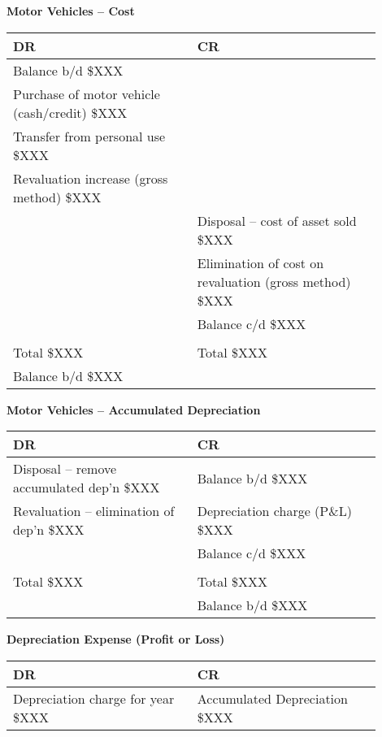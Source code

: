 
\textbf{Motor Vehicles – Cost}\\[3pt]
\begin{tabular}{@{}p{0.45\linewidth} p{0.45\linewidth}@{}}
\textbf{DR} & \textbf{CR} \\ \midrule
Balance b/d \hfill \$XXX & \\
Purchase of motor vehicle (cash/credit) \hfill \$XXX & \\
Transfer from personal use \hfill \$XXX & \\
Revaluation increase (gross method) \hfill \$XXX & \\
& Disposal – cost of asset sold \hfill \$XXX \\
& Elimination of cost on revaluation (gross method) \hfill \$XXX \\
& Balance c/d \hfill \$XXX \\[3pt]
\multicolumn{2}{c}{\hrulefill} \\
Total \hfill \$XXX & Total \hfill \$XXX \\[6pt]
Balance b/d \hfill \$XXX & \\
\end{tabular}

\vspace{1cm}

\textbf{Motor Vehicles – Accumulated Depreciation}\\[3pt]
\begin{tabular}{@{}p{0.45\linewidth} p{0.45\linewidth}@{}}
\textbf{DR} & \textbf{CR} \\ \midrule
Disposal – remove accumulated dep’n \hfill \$XXX & Balance b/d \hfill \$XXX \\
Revaluation – elimination of dep’n \hfill \$XXX & Depreciation charge (P\&L) \hfill \$XXX \\
& Balance c/d \hfill \$XXX \\[3pt]
\multicolumn{2}{c}{\hrulefill} \\
Total \hfill \$XXX & Total \hfill \$XXX \\[6pt]
& Balance b/d \hfill \$XXX \\
\end{tabular}

\vspace{1cm}

\textbf{Depreciation Expense (Profit or Loss)}\\[3pt]
\begin{tabular}{@{}p{0.45\linewidth} p{0.45\linewidth}@{}}
\textbf{DR} & \textbf{CR} \\ \midrule
Depreciation charge for year \hfill \$XXX & Accumulated Depreciation \hfill \$XXX \\
\end{tabular}

